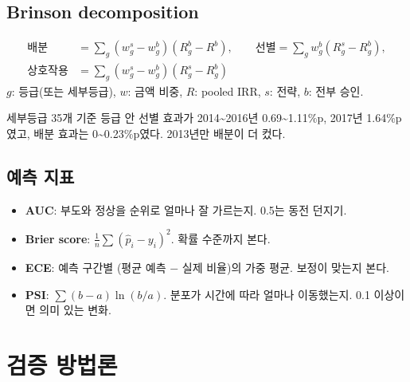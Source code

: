 \section{Brinson decomposition}
\begin{formulabox}
\begin{align*}
\text{배분}&=\sum_g (w^s_g-w^b_g)(R^b_g-R^b), \qquad
\text{선별}=\sum_g w^b_g(R^s_g-R^b_g),\\
\text{상호작용}&=\sum_g (w^s_g-w^b_g)(R^s_g-R^b_g)
\end{align*}
$g$: 등급(또는 세부등급), $w$: 금액 비중, $R$: pooled IRR, $s$: 전략, $b$: 전부 승인.
\end{formulabox}
\begin{keybox}[결과]
세부등급 35개 기준 등급 안 선별 효과가 2014\textasciitilde 2016년 0.69\textasciitilde 1.11\%p, 2017년 1.64\%p였고, 배분 효과는 0\textasciitilde 0.23\%p였다. 2013년만 배분이 더 컸다.
\end{keybox}

\section{예측 지표}
\begin{itemize}
\item \textbf{AUC}: 부도와 정상을 순위로 얼마나 잘 가르는지. 0.5는 동전 던지기.
\item \textbf{Brier score}: $\frac1n\sum(\hat p_i-y_i)^2$. 확률 수준까지 본다.
\item \textbf{ECE}: 예측 구간별 (평균 예측 $-$ 실제 비율)의 가중 평균. 보정이 맞는지 본다.
\item \textbf{PSI}: $\sum(b-a)\ln(b/a)$. 분포가 시간에 따라 얼마나 이동했는지. 0.1 이상이면 의미 있는 변화.
\end{itemize}

\chapter{검증 방법론}

